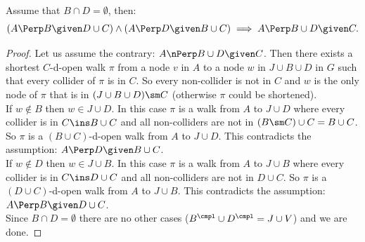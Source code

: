 \begin{Lem} Assume that $B \cap D = \emptyset$, then:
    \[ (A \Perp  B \given D \cup  C) \land (A \Perp  D \given B \cup C) \implies A  \Perp  B \cup D \given   C.\]
\begin{proof}
    Let us assume the contrary:  $A \nPerp  B \cup D \given C$.
    Then there exists a shortest $C$-d-open walk $\pi$ 
    from a node $v$ in $A$ to a node $w$ in $J \cup B \cup D $ in $G$ such that every collider of $\pi$ is in $C$.
    So every non-collider is not in $C$ and $w$ is 
    the only node of $\pi$ that is in $(J \cup B \cup D) \sm C$ (otherwise $\pi$ could be shortened). \\
    If $w \notin B$ then $w \in J \cup D$. In this case $\pi$ is a walk from $A$ to $J \cup D$ where every collider is in
    $C \ins B \cup C$ and all non-colliders are not in $(B\sm C) \cup C = B \cup C$. 
    So $\pi$ is a $(B \cup C)$-d-open walk from $A$ to $J \cup D$.
    This contradicts the assumption: $A \Perp  D \given B \cup C$.\\
    If $w \notin D$ then $w \in J \cup B$. In this case $\pi$ is a walk from $A$ to $J \cup B$ where every collider is in
    $C \ins D \cup C$ and all non-colliders are not in $D \cup C$. 
    So $\pi$ is a $(D \cup C)$-d-open walk from $A$ to $J \cup B$.
    This contradicts the assumption: $A \Perp  B \given D \cup  C$.\\
    Since $B \cap D = \emptyset$ there are no other cases ($B^\cmpl \cup D^\cmpl = J \cup V$) and we are done.
\end{proof}
\end{Lem}
